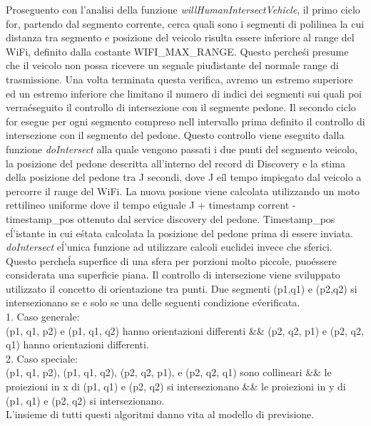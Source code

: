 \documentclass[conference]{IEEEtran}
\begin{document}
Proseguento con l'analisi della funzione \textit{willHumanIntersectVehicle}, il primo ciclo for, partendo dal segmento corrente, cerca quali sono i segmenti di polilinea la cui distanza tra segmento e posizione del veicolo risulta essere inferiore al range del WiFi, definito dalla costante WIFI\_MAX\_RANGE. Questo perche\' si presume che il veicolo non possa ricevere un segnale piu\' distante del normale range di trasmissione.
Una volta terminata questa verifica, avremo un estremo superiore ed un estremo inferiore che limitano il numero di indici dei segmenti sui quali poi verra\' eseguito il controllo di intersezione con il segmente pedone.
Il secondo ciclo for esegue per ogni segmento compreso nell intervallo prima definito il controllo di intersezione con il segmento del pedone.
Questo controllo viene eseguito dalla funzione \textit{doIntersect} alla quale vengono passati i due punti del segmento veicolo, la posizione del pedone descritta all'interno del record di Discovery e la stima della posizione del pedone tra J secondi, dove J e\' il tempo impiegato dal veicolo a percorre il range del WiFi.
La nuova posione viene calcolata utilizzando un moto rettilineo uniforme dove il tempo e\' uguale J + timestamp corrent - timestamp\_pos ottenuto dal service discovery del pedone. Timestamp\_pos e\' l'istante in cui e\' stata calcolata la posizione del pedone prima di essere inviata. 
\textit{doIntersect} e\' l'unica funzione ad utilizzare calcoli euclidei invece che sferici. Questo perche\' la superfice di una sfera per porzioni molto piccole, puo\' essere considerata una superficie piana.
Il controllo di intersezione viene sviluppato utilizzato il concetto di orientazione tra punti.
Due segmenti (p1,q1) e (p2,q2) si intersezionano se e solo se una delle seguenti condizione e\' verificata.
\\
1. Caso generale:\\
(p1, q1, p2) e (p1, q1, q2) hanno orientazioni differenti 
\&\& (p2, q2, p1) e (p2, q2, q1) hanno orientazioni differenti.
\\
2. Caso speciale:\\
(p1, q1, p2), (p1, q1, q2), (p2, q2, p1), e (p2, q2, q1) sono collineari \&\& le proiezioni in x di (p1, q1) e (p2, q2) si intersezionano \&\& le proiezioni in y di (p1, q1) e (p2, q2) si intersezionano.
\\
L'insieme di tutti questi algoritmi danno vita al modello di previsione.
 
\end{document}
